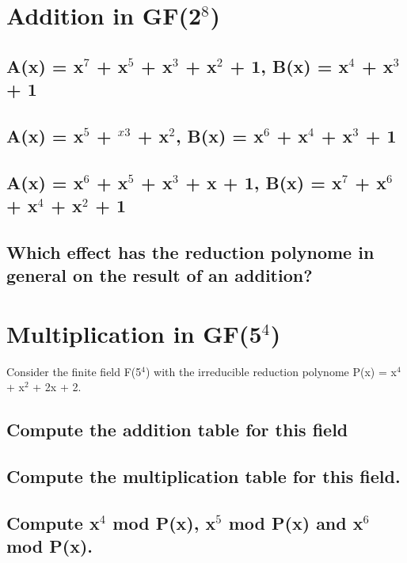 \section{Addition in GF(2$^{8}$)}

\subsection{A(x) = x$^{7}$ + x$^{5}$ + x$^{3}$ + x$^{2}$ + 1, B(x) = x$^{4}$ + x$^{3}$ + 1}
\label{section:1a}

\subsection{A(x) = x$^{5}$ + $^{x3}$ + x$^{2}$, B(x) = x$^{6}$ + x$^{4}$ + x$^{3}$ + 1}
\label{section:1b}

\subsection{A(x) = x$^{6}$ + x$^{5}$ + x$^{3}$ + x + 1, B(x) = x$^{7}$ + x$^{6}$ + x$^{4}$ + x$^{2}$ + 1}
\label{section:1c}

\subsection{Which effect has the reduction polynome in general on the result of an addition?}
\label{section:1d}


\section{Multiplication in GF(5$^{4}$)}
Consider the finite field F(5$^{4}$) with the irreducible reduction polynome P(x) = x$^{4}$ + x$^{2}$ + 2x + 2.

\subsection{Compute the addition table for this field}
\label{section:2a}

\subsection{Compute the multiplication table for this field.}
\label{section:2b}

\subsection{Compute x$^{4}$ mod P(x), x$^{5}$ mod P(x) and x$^{6}$ mod P(x).}
\label{section:2c}

